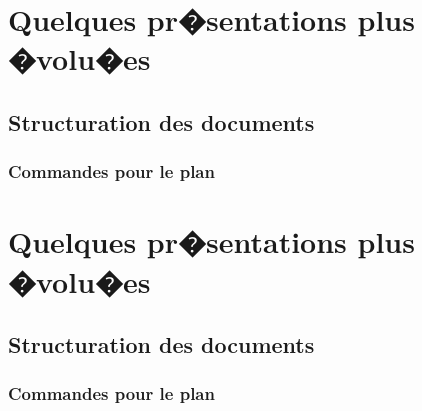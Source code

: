 \documentclass{article}
\begin{document}
\section{Quelques pr�sentations plus �volu�es}
\subsection{Structuration des documents}
\subsubsection{Commandes pour le plan}

\section{Quelques pr�sentations plus �volu�es}
\subsection{Structuration des documents}
\subsubsection{Commandes pour le plan}







\end{document}
